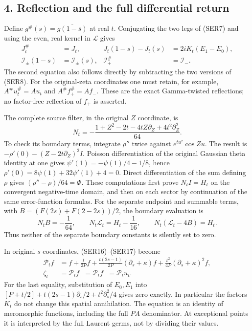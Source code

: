 \documentclass[
  10pt,
  a4paper,
]{article}
\begin{document}
\subsection{4. Reflection and the full differential
return}\label{reflection-and-the-full-differential-return}

Define \(g^\#(s)=\overline{g(1-\bar s)}\) at real \(t\). Conjugating the
two legs of (SER7) and using the even, real kernel in \(\mathcal L\)
gives \[
\begin{aligned}
J_t^\#&=J_t,&
J_t(1-s)-J_t(s)&=2iK_t(E_1-E_0),\\
\mathcal I_\pm(1-s)&=\mathcal I_\pm(s),&
\mathcal I_+^\#&=\mathcal I_-.
\end{aligned}\tag{SER15}
\] The second equation also follows directly by subtracting the two
versions of (SER8). For the original-zeta coordinates one must retain,
for example, \(A^\#u_t^\#=Au_t\) and \(A^\# f_+^\#=Af_-\). These are the
exact Gamma-twisted reflections; no factor-free reflection of \(f_+\) is
asserted.

The complete source filter, in the original \(Z\) coordinate, is \[
N_t=-\frac{1+Z^2-2t-4tZ\partial_Z+4t^2\partial_Z^2}{64}.
\tag{SER16}
\] To check its boundary terms, integrate \(\rho''\) twice against
\(e^{tu^2}\cos Zu\). The result is \(-\rho'(0)-(Z-2t\partial_Z)^2I\).
Poisson differentiation of the original Gaussian theta identity at one
gives \(\psi'(1)=-\psi(1)/4-1/8\), hence
\(\rho'(0)=8\psi(1)+32\psi'(1)+4=0\). Direct differentiation of the sum
defining \(\rho\) gives \((\rho''-\rho)/64=\Phi\). These computations
first prove \(N_tI=H_t\) on the convergent negative-time domain, and
then on each sector by continuation of the same error-function formulas.
For the separate endpoint and summable terms, with
\(B=(F(2s)+F(2-2s))/2\), the boundary evaluation is \[
N_tB=-\frac1{64},\qquad
N_t\mathcal L_t=H_t-\frac1{16},\qquad
N_t(\mathcal L_t-4B)=H_t.
\tag{SER17}
\] Thus neither of the separate boundary constants is silently set to
zero.

In original \(s\) coordinates, (SER16)--(SER17) become \[
\begin{aligned}
\mathcal P_t f
 &=f+\frac{t}{2P}f
 +\frac{t(2s-1)}{2P}(\partial_s+\kappa)f
 +\frac{t^2}{4P}(\partial_s+\kappa)^2f,\\
\zeta_t&=\mathcal P_t f_+=\mathcal P_t f_-=\mathcal P_t u_t.
\end{aligned}\tag{SER18}
\] For the last equality, substitution of \(E_0,E_1\) into
\([P+t/2]+t(2s-1)\partial_s/2+t^2\partial_s^2/4\) gives zero exactly. In
particular the factors \(K_t\) do not change this spatial annihilation.
The equation is an identity of meromorphic functions, including the full
\(P A\) denominator. At exceptional points it is interpreted by the full
Laurent germs, not by dividing their values.
\end{document}
